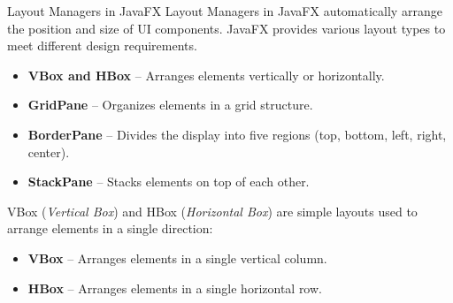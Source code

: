 \documentclass[aspectratio=169, table]{beamer}
\begin{document}
\begin{frame}[fragile]{Layout Managers in JavaFX}
	\vspace{20pt}
	Layout Managers in JavaFX automatically arrange the position and size of UI components.  
	JavaFX provides various layout types to meet different design requirements.
	
	\begin{itemize}
		\item \textbf{VBox and HBox} – Arranges elements vertically or horizontally.
		\item \textbf{GridPane} – Organizes elements in a grid structure.
		\item \textbf{BorderPane} – Divides the display into five regions (top, bottom, left, right, center).
		\item \textbf{StackPane} – Stacks elements on top of each other.
	\end{itemize}
	
	VBox (\textit{Vertical Box}) and HBox (\textit{Horizontal Box}) are simple layouts  
	used to arrange elements in a single direction:
	\begin{itemize}
		\item \textbf{VBox} – Arranges elements in a single vertical column.
		\item \textbf{HBox} – Arranges elements in a single horizontal row.
	\end{itemize}
\end{frame}
\end{document}
